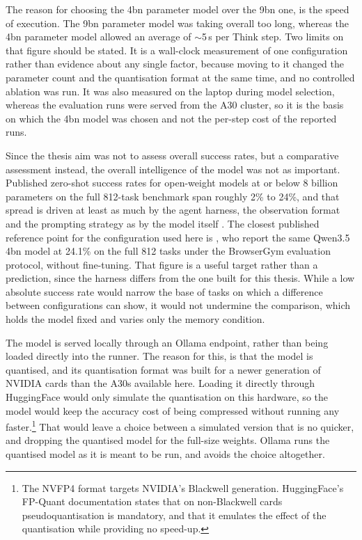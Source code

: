 \begin{enumerate}
    The reason for choosing the 4bn parameter model over the 9bn one, is the
    speed of execution. The 9bn parameter model was taking overall too long,
    whereas the 4bn parameter model allowed an average of $\sim$5\,s per Think
    step. Two limits on that figure should be stated. It is a wall-clock
    measurement of one configuration rather than evidence about any single
    factor, because moving to it changed the parameter count and the
    quantisation format at the same time, and no controlled ablation was run.
    It was also measured on the laptop during model selection, whereas the
    evaluation runs were served from the A30 cluster, so it is the basis on
    which the 4bn model was chosen and not the per-step cost of the reported
    runs.

    Since the thesis aim was not to assess overall success rates, but a
    comparative assessment instead, the overall intelligence of the model was
    not as important. Published zero-shot success rates for open-weight models
    at or below 8 billion parameters on the full 812-task benchmark span
    roughly 2\% to 24\%, and that spread is driven at least as much by the
    agent harness, the observation format and the prompting strategy as by the
    model itself \citep{zhang2025symbiotic, gandhi2026gobrowse, lu2026distillation}.
    The closest published reference point for the configuration used here is
    \citet{lu2026distillation}, who report the same Qwen3.5 4bn model at 24.1\%
    on the full 812 tasks under the BrowserGym evaluation protocol, without
    fine-tuning. That figure is a useful target rather than a prediction, since
    the harness differs from the one built for this thesis. While a low
    absolute success rate would narrow the base of tasks on which a difference
    between configurations can show, it would not undermine the comparison,
    which holds the model fixed and varies only the memory condition.

    The model is served locally through an Ollama endpoint, rather than being
    loaded directly into the runner. The reason for this, is that the model is
    quantised, and its quantisation format was built for a newer generation of
    NVIDIA cards than the A30s available here. Loading it directly through
    HuggingFace would only simulate the quantisation on this hardware, so the
    model would keep the accuracy cost of being compressed without running any
    faster.\footnote{The NVFP4 format targets NVIDIA's Blackwell generation.
    HuggingFace's FP-Quant documentation states that on non-Blackwell cards
    pseudoquantisation is mandatory, and that it emulates the effect of the
    quantisation while providing no speed-up.} That would leave a choice
    between a simulated version that is no quicker, and dropping the quantised
    model for the full-size weights. Ollama runs the quantised model as it is
    meant to be run, and avoids the choice altogether.


\end{enumerate}
